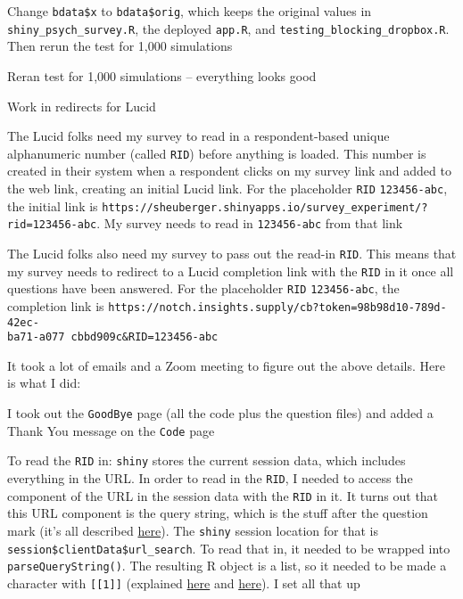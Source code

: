 \documentclass[12pt]{article}
\begin{document}
\begin{coi}
\begin{coi}
\begin{coi}
						\item Change \texttt{bdata\$x} to \texttt{bdata\$orig}, which keeps the original values in \texttt{shiny\_psych\_survey.R}, the deployed \texttt{app.R}, and \texttt{testing\_blocking\_dropbox.R}. Then rerun the test for 1,000 simulations
						\item Reran test for 1,000 simulations -- everything looks good
					\end{coi}
			\end{coi} 
		\item Work in redirects for Lucid
			\begin{coi}
				\item The Lucid folks need my survey to read in a respondent-based unique alphanumeric number (called \texttt{RID}) before anything is loaded. This number is created in their system when a respondent clicks on my survey link and added to the web link, creating an initial Lucid link. For the placeholder \texttt{RID} \texttt{123456-abc}, the initial link is \texttt{https://sheuberger.shinyapps.io/survey\_experiment/?rid=123456-abc}. My survey needs to read in \texttt{123456-abc} from that link
				\item The Lucid folks also need my survey to pass out the read-in \texttt{RID}. This means that my survey needs to redirect to a Lucid completion link with the \texttt{RID} in it once all questions have been answered. For the placeholder \texttt{RID} \texttt{123456-abc}, the completion link is \texttt{https://notch.insights.supply/cb?token=98b98d10-789d-42ec-}\\\texttt{ba71-a077
						cbbd909c\&RID=123456-abc}
				\item It took a lot of emails and a Zoom meeting to figure out the above details. Here is what I did:
					\begin{coi}
						\item I took out the \texttt{GoodBye} page (all the code plus the question files) and added a Thank You message on the \texttt{Code} page
						\item To read the \texttt{RID} in: \texttt{shiny} stores the current session data, which includes everything in the URL. In order to read in the \texttt{RID}, I needed to access the component of the URL in the session data with the \texttt{RID} in it. It turns out that this URL component is the query string, which is the stuff after the question mark (it's all described \href{https://community.tealiumiq.com/t5/iQ-Tag-Management/URL-Components-Explained/ta-p/5573}{here}). The \texttt{shiny} session location for that is \texttt{session\$clientData\$url\_search}. To read that in, it needed to be wrapped into \texttt{parseQueryString()}. The resulting R object is a list, so it needed to be made a character with \texttt{[[1]]} (explained \href{https://shiny.rstudio.com/articles/client-data.html}{here} and \href{https://shiny.rstudio.com/reference/shiny/0.14/parseQueryString.html}{here}). I set all that up

\end{coi}
\end{coi}
\end{coi}
\end{document}
